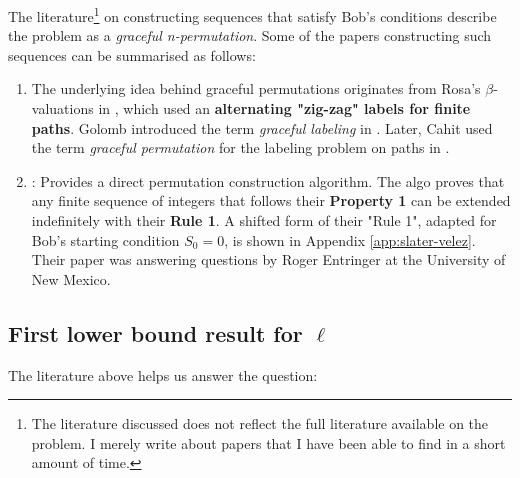 The literature\footnote{The literature discussed does not reflect the full literature available on the problem. I merely write about papers that I have been able to find in a short amount of time.} on constructing sequences that satisfy Bob's conditions describe the problem as a \textit{graceful n-permutation}. Some of the papers constructing such sequences can be summarised as follows:


\begin{enumerate}[label=(\Roman*)] 

\item \label{literature:rosa-golomb-cahit} The underlying idea behind graceful permutations originates from Rosa’s $\beta$-valuations in \cite{rosa1967valuations}, which used an \textbf{alternating "zig-zag" labels for finite paths}. Golomb introduced the term \textit{graceful labeling} in \cite{golomb1972number}. Later, Cahit used the term \textit{graceful permutation} for the labeling problem on paths in \cite{cahit1977graceful}.

 \item \label{literature:slater1977permutations} \cite{slater1977permutations}: Provides a direct permutation construction algorithm. The algo proves that any finite sequence of integers that follows their \textbf{Property 1} can be extended indefinitely with their \textbf{Rule 1}. A shifted form of their "Rule 1", adapted for Bob's starting condition $S_0 = 0$, is shown in Appendix \ref{app:slater-velez}. Their paper was answering questions by Roger Entringer at the University of New Mexico.


\end{enumerate}

\subsection{First lower bound result for $\ell$}

The literature above helps us answer the question:

